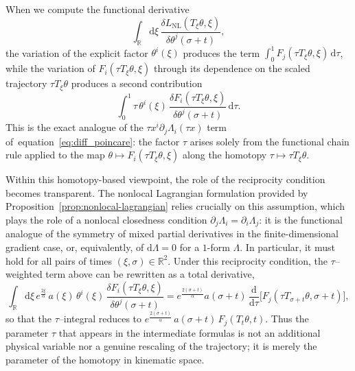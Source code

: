 \documentclass{article} %
\def\eqref#1{equation~\ref{#1}}
\begin{document}
When we compute the functional derivative
\[
\int_\mathbb{R}\mathrm{d}\xi\,\frac{\delta L_{\mathrm{NL}}(T_\xi \theta, \xi)}{\delta\theta^j(\sigma+t)},
\]
the variation of the explicit factor $\theta^i(\xi)$ produces the term $\int_0^1 F_j(\tau T_\xi\theta,\xi)\,\mathrm{d}\tau$, while the variation of $F_i(\tau T_\xi\theta,\xi)$ through its dependence on the scaled trajectory $\tau T_\xi\theta$ produces a second contribution
\[
\int_0^1 \tau\,\theta^i(\xi)\,
\frac{\delta F_i(\tau T_\xi\theta,\xi)}{\delta\theta^j(\sigma+t)}\,\mathrm{d}\tau.
\]
This is the exact analogue of the $\tau x^i\partial_j\Lambda_i(\tau x)$ term of~\eqref{eq:diff_poincare}: the factor $\tau$ arises solely from the functional chain rule applied to the map $\theta\mapsto F_i(\tau T_\xi\theta,\xi)$ along the homotopy $\tau\mapsto\tau T_\xi\theta$.

Within this homotopy-based viewpoint, the role of the reciprocity condition becomes transparent. The nonlocal Lagrangian formulation provided by Proposition~\ref{prop:nonlocal-lagrangian} relies crucially on this assumption, which plays the role of a nonlocal closedness condition  $\partial_j\Lambda_i=\partial_i\Lambda_j$: it is the functional analogue of the symmetry of mixed partial derivatives in the finite-dimensional gradient case, or, equivalently, of $\mathrm{d}\Lambda=0$ for a $1$-form $\Lambda$. In particular, it must hold for all pairs of times $(\xi,\sigma)\in\mathbb{R}^2$. Under this reciprocity condition, the $\tau$–weighted term above can be rewritten as a total derivative,
\[
\int_\mathbb{R}\mathrm{d}\xi\,e^{\frac{2\xi}{\alpha}}\,a(\xi)\,\theta^i(\xi)\,
\frac{\delta F_i(\tau T_\xi\theta,\xi)}{\delta\theta^j(\sigma+t)}
=e^{\frac{2(\sigma + t)}{\alpha}} a(\sigma + t)\,\frac{\mathrm{d}}{\mathrm{d}\tau}
\bigl[F_j(\tau T_{\sigma+t}\theta,\sigma+t)\bigr],
\]
so that the $\tau$–integral reduces to $e^{\frac{2(\sigma + t)}{\alpha}}\,a(\sigma + t)\,F_j(T_t\theta,t)$. Thus the parameter $\tau$ that appears in the intermediate formulas is not an additional physical variable nor a genuine rescaling of the trajectory; it is merely the parameter of the homotopy in kinematic space.
\end{document}
